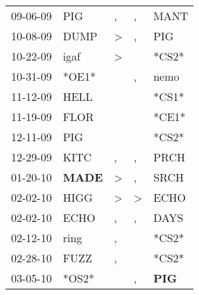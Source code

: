 \begin{supertabular}{p{0.07\textwidth}p{0.06\textwidth}p{0.02\textwidth}p{0.02\textwidth}p{0.06\textwidth}}
          09-06-09\textsuperscript{} &            PIG\textsuperscript{} &                , &                , &           MANT\textsuperscript{} \\
          10-08-09\textsuperscript{} &           DUMP\textsuperscript{} &     \textgreater &                , &            PIG\textsuperscript{} \\
          10-22-09\textsuperscript{} &           igaf\textsuperscript{} &     \textgreater &                  &                            *CS2* \\
          10-31-09\textsuperscript{} &                            *OE1* &                  &                , &           nemo\textsuperscript{} \\
          11-12-09\textsuperscript{} &           HELL\textsuperscript{} &                  &                  &                            *CS1* \\
          11-19-09\textsuperscript{} &           FLOR\textsuperscript{} &                  &                  &                            *CE1* \\
          12-11-09\textsuperscript{} &            PIG\textsuperscript{} &                  &                  &                            *CS2* \\
          12-29-09\textsuperscript{} &           KITC\textsuperscript{} &                , &                , &           PRCH\textsuperscript{} \\
          01-20-10\textsuperscript{} &  \textbf{MADE\textsuperscript{}} &     \textgreater &                , &           SRCH\textsuperscript{} \\
          02-02-10\textsuperscript{} &           HIGG\textsuperscript{} &     \textgreater &     \textgreater &           ECHO\textsuperscript{} \\
          02-02-10\textsuperscript{} &           ECHO\textsuperscript{} &                , &                , &           DAYS\textsuperscript{} \\
          02-12-10\textsuperscript{} &           ring\textsuperscript{} &                , &                  &                            *CS2* \\
          02-28-10\textsuperscript{} &           FUZZ\textsuperscript{} &                , &                  &                            *CS2* \\
          03-05-10\textsuperscript{} &                            *OS2* &                  &                , &   \textbf{PIG\textsuperscript{}} \\

\end{supertabular}
